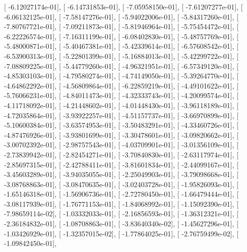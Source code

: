 \documentclass{article}
\begin{document}
       [ -6.12027174e-01],
       [ -6.14731853e-01],
       [ -7.05958150e-01],
       [ -7.61207277e-01],
       [ -6.06132125e-01],
       [ -7.58147276e-01],
       [ -5.94022006e-01],
       [ -5.84317260e-01],
       [ -7.80767721e-01],
       [ -7.09211873e-01],
       [ -5.81946964e-01],
       [ -5.75454472e-01],
       [ -6.22226574e-01],
       [ -7.16311199e-01],
       [ -6.08402830e-01],
       [ -5.48757769e-01],
       [ -5.48000871e-01],
       [ -5.40467381e-01],
       [ -5.42339614e-01],
       [ -6.57608542e-01],
       [ -6.53900313e-01],
       [ -5.22801399e-01],
       [ -5.16884013e-01],
       [ -5.42299722e-01],
       [ -7.08809225e-01],
       [ -5.44779260e-01],
       [ -4.96321951e-01],
       [ -6.57349120e-01],
       [ -4.85303103e-01],
       [ -4.79580274e-01],
       [ -4.74149050e-01],
       [ -5.39264770e-01],
       [ -4.64862292e-01],
       [ -4.56809864e-01],
       [ -6.22859219e-01],
       [ -4.49101622e-01],
       [ -5.76066231e-01],
       [ -4.84011473e-01],
       [ -4.32333743e-01],
       [ -4.20099574e-01],
       [ -4.11718092e-01],
       [ -4.21448602e-01],
       [ -4.01448430e-01],
       [ -3.96118189e-01],
       [ -4.72035864e-01],
       [ -3.93922257e-01],
       [ -4.51157737e-01],
       [ -3.66970899e-01],
       [ -5.10600384e-01],
       [ -3.63574953e-01],
       [ -3.50483291e-01],
       [ -4.33460726e-01],
       [ -4.87476926e-01],
       [ -3.93801699e-01],
       [ -3.30478601e-01],
       [ -3.09820662e-01],
       [ -3.00702392e-01],
       [ -2.98757543e-01],
       [ -4.03709901e-01],
       [ -3.01356109e-01],
       [ -2.73839942e-01],
       [ -2.82454271e-01],
       [ -3.70840830e-01],
       [ -2.63117974e-01],
       [ -2.85697315e-01],
       [ -2.42788411e-01],
       [ -3.81601834e-01],
       [ -2.44099167e-01],
       [ -3.45603289e-01],
       [ -3.94035055e-01],
       [ -2.25049903e-01],
       [ -3.79098668e-01],
       [ -3.08768863e-01],
       [ -3.08470635e-01],
       [ -3.02403728e-01],
       [ -1.95826093e-01],
       [ -1.65146318e-01],
       [ -1.56906736e-01],
       [ -2.72780450e-01],
       [ -1.66479444e-01],
       [ -3.08117939e-01],
       [ -1.76771153e-01],
       [ -1.84068992e-01],
       [ -1.15092390e-01],
       [ -7.98659114e-02],
       [ -1.03332033e-01],
       [ -2.16856593e-01],
       [ -1.36312321e-01],
       [ -2.36184832e-01],
       [ -1.08708863e-01],
       [ -3.83640340e-02],
       [ -1.45627296e-01],
       [ -1.03426929e-01],
       [ -1.32357015e-02],
       [ -1.77864025e-01],
       [ -2.76759499e-02],
       [ -1.09842450e-01],
\end{document}

